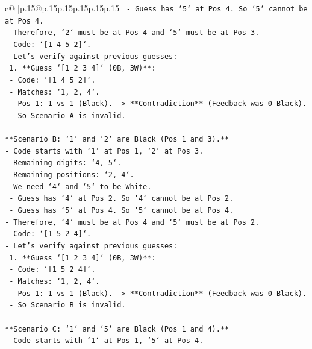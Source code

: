 \documentclass{article}
\begin{document}
{\begin{supertabular}{c@{$\;$}|p{.15\linewidth}@{}p{.15\linewidth}p{.15\linewidth}p{.15\linewidth}p{.15\linewidth}p{.15\linewidth}}
{{{\texttt{    {-} Guess has `5` at Pos 4. So `5` cannot be at Pos 4.} \\
\texttt{{-} Therefore, `2` must be at Pos 4 and `5` must be at Pos 3.} \\
\texttt{{-} Code: `{[}1 4 5 2{]}`.} \\
\texttt{{-} Let's verify against previous guesses:} \\
\texttt{    1.  **Guess `{[}1 2 3 4{]}` (0B, 3W)**:} \\
\texttt{        {-} Code: `{[}1 4 5 2{]}`.} \\
\texttt{        {-} Matches: `1, 2, 4`.} \\
\texttt{        {-} Pos 1: 1 vs 1 (Black). {-}> **Contradiction** (Feedback was 0 Black).} \\
\texttt{    {-} So Scenario A is invalid.} \\
\\ 
\texttt{**Scenario B: `1` and `2` are Black (Pos 1 and 3).**} \\
\texttt{{-} Code starts with `1` at Pos 1, `2` at Pos 3.} \\
\texttt{{-} Remaining digits: `4, 5`.} \\
\texttt{{-} Remaining positions: `2, 4`.} \\
\texttt{{-} We need `4` and `5` to be White.} \\
\texttt{    {-} Guess has `4` at Pos 2. So `4` cannot be at Pos 2.} \\
\texttt{    {-} Guess has `5` at Pos 4. So `5` cannot be at Pos 4.} \\
\texttt{{-} Therefore, `4` must be at Pos 4 and `5` must be at Pos 2.} \\
\texttt{{-} Code: `{[}1 5 2 4{]}`.} \\
\texttt{{-} Let's verify against previous guesses:} \\
\texttt{    1.  **Guess `{[}1 2 3 4{]}` (0B, 3W)**:} \\
\texttt{        {-} Code: `{[}1 5 2 4{]}`.} \\
\texttt{        {-} Matches: `1, 2, 4`.} \\
\texttt{        {-} Pos 1: 1 vs 1 (Black). {-}> **Contradiction** (Feedback was 0 Black).} \\
\texttt{    {-} So Scenario B is invalid.} \\
\\ 
\texttt{**Scenario C: `1` and `5` are Black (Pos 1 and 4).**} \\
\texttt{{-} Code starts with `1` at Pos 1, `5` at Pos 4.} \\
}}}
\end{supertabular}}
\end{document}
